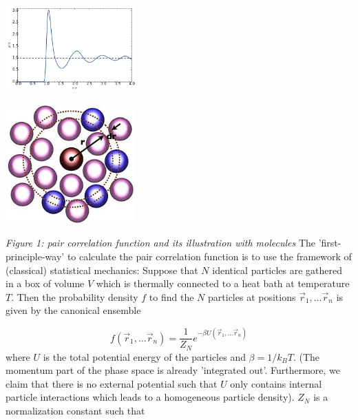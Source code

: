\documentclass[11pt,a4paper]{article}
\begin{document}
\begin{minipage}[hbt]{5cm}
	\centering
	\includegraphics[width=5cm]{RDF.png}
	\label{"halllo"}
\end{minipage}
\hfill
\begin{minipage}[hbt]{5cm}
	\centering
	\includegraphics[width=5cm]{RDF_illustrated.png}
	\label{Bild2}
\end{minipage}
\newline
\textit{Figure 1: pair correlation function and its illustration with molecules} \newline \newline
The 'first-principle-way' to calculate the pair correlation function is to use the framework of (classical) statistical mechanics:
Suppose that $N$ identical particles are gathered in a box of volume $V$ which is thermally connected to a heat bath at temperature $T$. 
Then the probability density $f$ to find the $N$ particles at positions $\vec r_1, \dots \vec r_n$ is given by the canonical ensemble

\begin{equation}
f(\vec r_1, \dots \vec r_n) = \frac{1}{Z_N} e^{-\beta U(\vec r_1, \dots \vec r_n)}
\end{equation}
where $U$ is the total potential energy of the particles and $\beta = 1/k_BT$. (The momentum part of the phase space is already 'integrated out'.
Furthermore, we claim that there is no external potential such that $U$ only contains internal particle interactions which leads to a
homogeneous particle density).
$Z_N$ is a normalization constant such that
\end{document}
